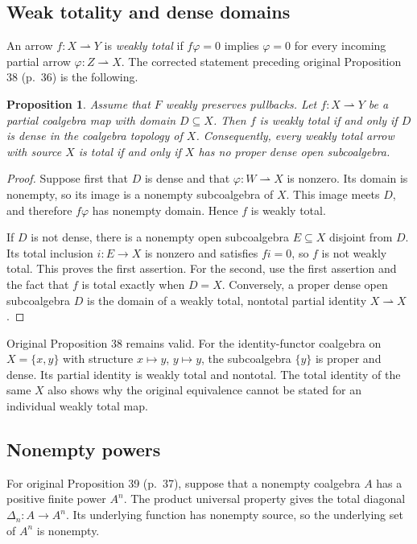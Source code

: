 \documentclass[11pt]{article}
\newtheorem{proposition}[theorem]{Proposition}
\begin{document}
\subsection{Weak totality and dense domains}
An arrow $f:X\rightharpoonup Y$ is \emph{weakly total} if $f\varphi=0$ implies $\varphi=0$ for every incoming partial arrow $\varphi:Z\rightharpoonup X$. The corrected statement preceding original Proposition 38 (p.~36) is the following.

\begin{proposition}\label{prop:weak-total-dense}
Assume that $F$ weakly preserves pullbacks. Let $f:X\rightharpoonup Y$ be a partial coalgebra map with domain $D\subseteq X$. Then $f$ is weakly total if and only if $D$ is dense in the coalgebra topology of $X$. Consequently, every weakly total arrow with source $X$ is total if and only if $X$ has no proper dense open subcoalgebra.
\end{proposition}
\begin{proof}
Suppose first that $D$ is dense and that $\varphi:W\rightharpoonup X$ is nonzero. Its domain is nonempty, so its image is a nonempty subcoalgebra of $X$. This image meets $D$, and therefore $f\varphi$ has nonempty domain. Hence $f$ is weakly total.

If $D$ is not dense, there is a nonempty open subcoalgebra $E\subseteq X$ disjoint from $D$. Its total inclusion $i:E\to X$ is nonzero and satisfies $fi=0$, so $f$ is not weakly total. This proves the first assertion. For the second, use the first assertion and the fact that $f$ is total exactly when $D=X$. Conversely, a proper dense open subcoalgebra $D$ is the domain of a weakly total, nontotal partial identity $X\rightharpoonup X$.
\end{proof}

Original Proposition 38 remains valid. For the identity-functor coalgebra on $X=\{x,y\}$ with structure $x\mapsto y$, $y\mapsto y$, the subcoalgebra $\{y\}$ is proper and dense. Its partial identity is weakly total and nontotal. The total identity of the same $X$ also shows why the original equivalence cannot be stated for an individual weakly total map.

\subsection{Nonempty powers}
For original Proposition 39 (p.~37), suppose that a nonempty coalgebra $A$ has a positive finite power $A^n$. The product universal property gives the total diagonal $\Delta_n:A\to A^n$. Its underlying function has nonempty source, so the underlying set of $A^n$ is nonempty.
\end{document}
